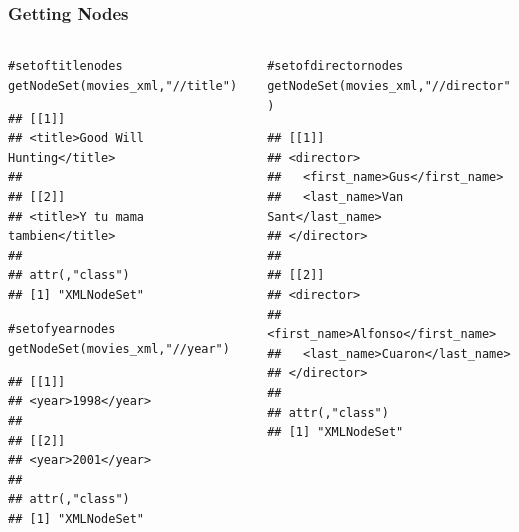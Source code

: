\documentclass{beamer}\usepackage[]{graphicx}\usepackage[]{color}
\makeatletter
\newcommand{\hlstr}[1]{\textcolor[rgb]{0.063,0.58,0.627}{#1}}%
\newcommand{\hlcom}[1]{\textcolor[rgb]{0.588,0.588,0.588}{#1}}%
\newcommand{\hlstd}[1]{\textcolor[rgb]{0.196,0.196,0.196}{#1}}%
\newcommand{\hlkwd}[1]{\textcolor[rgb]{0.78,0.227,0.412}{#1}}%
\newenvironment{kframe}{%
 \def\at@end@of@kframe{}%
 \ifinner\ifhmode%
  \def\at@end@of@kframe{\end{minipage}}%
  \begin{minipage}{\columnwidth}%
 \fi\fi%
 \def\FrameCommand##1{\hskip\@totalleftmargin \hskip-\fboxsep
 \colorbox{shadecolor}{##1}\hskip-\fboxsep
     \hskip-\linewidth \hskip-\@totalleftmargin \hskip\columnwidth}%
 \MakeFramed {\advance\hsize-\width
   \@totalleftmargin\z@ \linewidth\hsize
   \@setminipage}}%
 {\par\unskip\endMakeFramed%
 \at@end@of@kframe}
\newenvironment{knitrout}{}{} %
\makeatother
\begin{document}

\begin{frame}[fragile]
\frametitle{Getting Nodes}

\begin{columns}[t]
\begin{column}{0.5\textwidth}
\begin{knitrout}\tiny
{}\color{fgcolor}\begin{kframe}
\begin{alltt}
\hlcom{# set of title nodes}
\hlkwd{getNodeSet}\hlstd{(movies_xml,} \hlstr{"//title"}\hlstd{)}
\end{alltt}
\begin{verbatim}
## [[1]]
## <title>Good Will Hunting</title> 
## 
## [[2]]
## <title>Y tu mama tambien</title> 
## 
## attr(,"class")
## [1] "XMLNodeSet"
\end{verbatim}
\begin{alltt}
\hlcom{# set of year nodes}
\hlkwd{getNodeSet}\hlstd{(movies_xml,} \hlstr{"//year"}\hlstd{)}
\end{alltt}
\begin{verbatim}
## [[1]]
## <year>1998</year> 
## 
## [[2]]
## <year>2001</year> 
## 
## attr(,"class")
## [1] "XMLNodeSet"
\end{verbatim}
\end{kframe}
\end{knitrout}
\end{column}

\begin{column}{0.5\textwidth}
\begin{knitrout}\tiny
{}\color{fgcolor}\begin{kframe}
\begin{alltt}
\hlcom{# set of director nodes}
\hlkwd{getNodeSet}\hlstd{(movies_xml,} \hlstr{"//director"}\hlstd{)}
\end{alltt}
\begin{verbatim}
## [[1]]
## <director>
##   <first_name>Gus</first_name>
##   <last_name>Van Sant</last_name>
## </director> 
## 
## [[2]]
## <director>
##   <first_name>Alfonso</first_name>
##   <last_name>Cuaron</last_name>
## </director> 
## 
## attr(,"class")
## [1] "XMLNodeSet"
\end{verbatim}
\end{kframe}
\end{knitrout}
\end{column}
\end{columns}

\end{frame}
\end{document}
